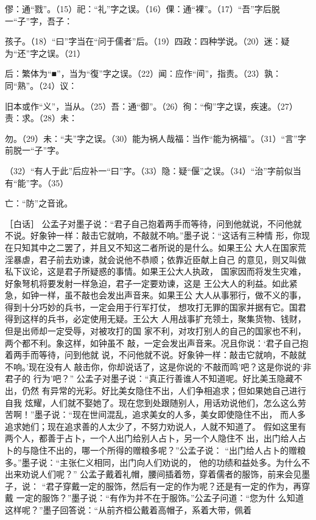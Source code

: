 \documentclass[12pt,UTF8]{ctexbook}
\begin{document}
僇：通“戮”。（15）祀：“礼”字之误。（16）倮：通“裸”。（17）“吾”字后脱一“子”字，吾子： 

孩子。（18）“曰”字当在“问于儒者”后。（19）四政：四种学说。（20）迷：疑为“还”字之误。（21） 

后：繁体为“■”，当为“復”字之误。（22）闻：应作“间”，指责。（23）孰：同“熟”。（24）议： 

旧本或作“义”，当从。（25）吾：通“御”。（26）徇：“侚”字之误，疾速。（27）责：求。（28）未： 

勿。（29）未：“夫”字之误。（30）能为祸人哉福：当作“能为祸福”。（31）“言”字前脱一“子”字。 

（32）“有人于此”后应补一“曰”字。（33）隐：疑“偃”之误。（34）“治”字前似当有“能”字。（35） 

亡：“防”之音讹。 

［白话］ 
公孟子对墨子说：“君子自己抱着两手而等待，问到他就说，不问他就 
不说。好象钟一样：敲击它就响，不敲就不响。”墨子说：“这话有三种情 
形，你现在只知其中之二罢了，并且又不知这二者所说的是什么。如果王公 
大人在国家荒淫暴虐，君子前去劝谏，就会说他不恭顺；依靠近臣献上自己 
的意见，则又叫做私下议论，这是君子所疑惑的事情。如果王公大人执政， 
国家因而将发生灾难，好象弩机将要发射一样急迫，君子一定要劝谏，这是 
王公大人的利益。如此紧急，如钟一样，虽不敲也会发出声音来。如果王公 
大人从事邪行，做不义的事，得到十分巧妙的兵书，一定会用于行军打仗， 
想攻打无罪的国家并据有它。国君得到这样的兵书，必定使用无疑。王公大 
人用战事扩充领土，聚集货物、钱财，但是出师却一定受辱，对被攻打的国 
家不利，对攻打别人的自己的国家也不利，两个都不利。象这样，如钟虽不 
敲，一定会发出声音来。况且你说：‘君子自己抱着两手而等待，问到他就 
说，不问他就不说。好象钟一样：敲击它就响，不敲就不响。’现在没有人 
敲击你，你却说话了，这是你说的‘不敲而鸣’吧？这是你说的‘非君子的 
行为’吧？” 
公孟子对墨子说：“真正行善谁人不知道呢。好比美玉隐藏不出，仍然 
有异常的光彩。好比美女隐住不出，人们争相追求；但如果她自己进行自我 
炫耀，人们就不娶她了。现在您到处跟随别人，用话劝说他们，怎么这么劳 
苦啊！”墨子说：“现在世间混乱，追求美女的人多，美女即使隐住不出， 
而人多追求她们；现在追求善的人太少了，不努力劝说人，人就不知道了。 
假如这里有两个人，都善于占卜，一个人出门给别人占卜，另一个人隐住不 
出，出门给人占卜的与隐住不出的，哪一个所得的赠粮多呢？”公孟子说： 
“出门给人占卜的赠粮多。”墨子说：“主张仁义相同，出门向人们劝说的， 
他的功绩和益处多。为什么不出来劝说人们呢？” 
公孟子戴着礼帽，腰间插着笏，穿着儒者的服饰，前来会见墨子，说： 
“君子穿戴一定的服饰，然后有一定的作为呢？还是有一定的作为，再穿戴 
一定的服饰？”墨子说：“有作为并不在于服饰。”公孟子问道：“您为什 
么知道这样呢？”墨子回答说：“从前齐桓公戴着高帽子，系着大带，佩着 
\end{document}

